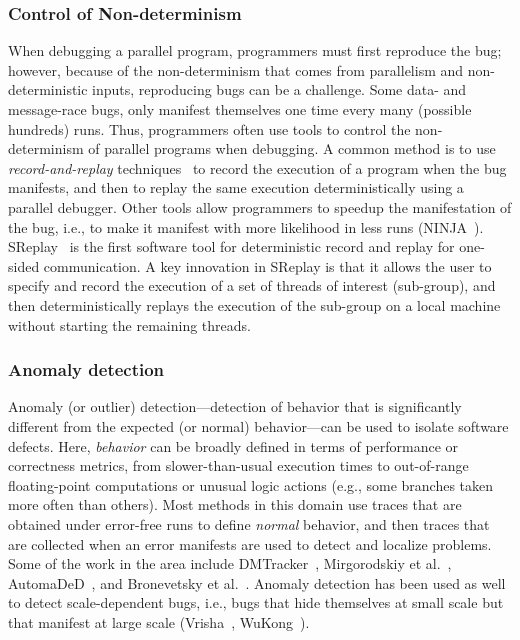 \subsubsection{Control of Non-determinism}
When debugging a parallel program, programmers must first reproduce
the bug; however, because of the non-determinism that comes from 
parallelism and non-deterministic inputs, reproducing bugs can be a challenge.
Some data- and message-race bugs, only manifest themselves
one time every many (possible hundreds) runs. Thus, programmers often use tools
to control the non-determinism of parallel programs when debugging.
A common method is to use \textit{record-and-replay} techniques~\cite{REMPI} to record
the execution of a program when the bug manifests, and then to replay the same
execution deterministically using a parallel debugger. Other tools allow
programmers to speedup the manifestation of the bug, i.e., to make it manifest
with more likelihood in less runs (NINJA~\cite{NINJA}).
SReplay~\cite{ICS'16,PPoPP'16} is the first software tool for
deterministic record and replay for one-sided communication. A key
innovation in SReplay is that it allows the user to specify and record
the execution of a set of threads of interest (sub-group), and then
deterministically replays the execution of the sub-group on a local
machine without starting the remaining threads. 

\subsubsection{Anomaly detection}
Anomaly (or outlier) detection---detection of behavior that is significantly
different from the expected (or normal) behavior---can be used to isolate 
software defects. Here, \textit{behavior} can be broadly defined in terms 
of performance or correctness metrics, from slower-than-usual execution 
times to out-of-range floating-point computations or unusual logic actions 
(e.g., some branches taken more often than others). Most methods in this 
domain use traces that are obtained under error-free runs to define 
\textit{normal} behavior, and then traces that are collected when 
an error manifests are used to detect and localize problems.
Some of the work in the area include DMTracker~\cite{DMTRACKER}, Mirgorodskiy et al.~\cite{Mirgorodskiy2006},
AutomaDeD~\cite{AUTOMADED}, and Bronevetsky et al.~\cite{Bronevetsky2012}. 
Anomaly detection has been used as well to detect scale-dependent bugs, 
i.e., bugs that hide themselves at small scale but that manifest at 
large scale (Vrisha~\cite{VRISHA}, WuKong~\cite{VRISHA}).

